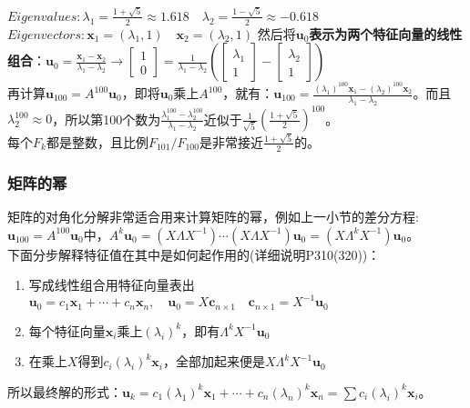     $Eigenvalues: \lambda_1 = \frac{1+\sqrt{5}}{2} \approx 1.618 \quad \lambda_2 = \frac{1-\sqrt{5}}{2} \approx -0.618$\\
    $Eigenvectors: \bm{x}_1 = (\lambda_1,1)\quad \bm{x}_2 = (\lambda_2,1)$
    然后将$\bm{u}_0$\textbf{表示为两个特征向量的线性组合}：$\bm{u}_0 =\frac{\bm{x}_1-\bm{x}_2}{\lambda_1 - \lambda_2} \rightarrow \left[\begin{array}{c} 1 \\ 0 \end{array}\right]= \frac{1}{\lambda_1 - \lambda_2}\left(\left[\begin{array}{c} \lambda_1 \\ 1 \end{array}\right]- \left[\begin{array}{c} \lambda_2 \\ 1 \end{array}\right]\right)$
    \\
    再计算$\bm{u}_{100} = A^{100} \bm{u}_0$，即将$\bm{u}_0$乘上$A^{100}$，就有：$\bm{u}_{100}= \frac{(\lambda_1)^{100}\bm{x}_1 - (\lambda_2)^{100}\bm{x}_2}{\lambda_1 - \lambda_2}$。而且$\lambda_2^{100} \approx 0$，所以第100个数为$\frac{\lambda_1^{100} - \lambda_2^{100}}{\lambda_1 - \lambda_2}$近似于$\frac{1}{\sqrt{5}}\left(\frac{1+\sqrt{5}}{2}\right)^{100}$。
    \\
    每个$F_k$都是整数，且比例$F_101 / F_100$是非常接近$\frac{1+\sqrt{5}}{2}$的。

    \subsubsection{矩阵的幂}
    矩阵的对角化分解非常适合用来计算矩阵的幂，例如上一小节的差分方程:$\bm{u}_{100} = A^{100} \bm{u}_0$中，$A^{k}\bm{u}_0=(X\Lambda X^{-1})\cdots (X\Lambda X^{-1})\bm{u}_0=(X\Lambda^{k} X^{-1})\bm{u}_0$。
    \\
    下面分步解释特征值在其中是如何起作用的(详细说明P310(320))：
    \begin{enumerate}
        \item 写成线性组合用特征向量表出$\bm{u}_0 = c_1\bm{x}_1 + \cdots + c_n\bm{x}_n, \quad  \bm{u}_0= X \bm{c}_{n\times 1} \quad \bm{c}_{n\times 1}= X^{-1}\bm{u}_0$
        \item 每个特征向量$\bm{x}_i$乘上$(\lambda_i)^k$，即有$\Lambda^k X^{-1}\bm{u}_0$
        \item 在乘上$X$得到$c_i (\lambda_i)^k\bm{x}_i$，全部加起来便是$X\Lambda^{k} X^{-1}\bm{u}_0$
    \end{enumerate}
    所以最终解的形式：$\bm{u}_k =c_1 (\lambda_1)^k\bm{x}_1+\cdots +c_n (\lambda_n)^k\bm{x}_n =\sum{ c_i (\lambda_i)^k\bm{x}_i}$。

